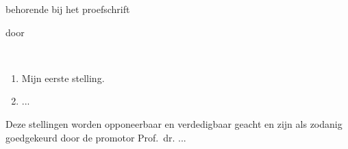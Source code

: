\documentclass[10pt]{book}
\begin{document}
\begin{center}

{\makeatletter
\bfseries\Large{}
\makeatother}

\smallskip

{\large behorende bij het proefschrift}

\bigskip
\medskip

{\makeatletter
\bfseries\LARGE\sffamily{\@title}
\makeatother}

{\makeatletter
\ifx\@subtitle\undefined\else
    \smallskip
    \Large\@subtitle
\fi
\makeatother}

\medskip

{\large door}

\medskip

\makeatletter
{\large \@firstname~\@middlename~{\MakeUppercase \@lastname}}
\makeatother

\end{center}

\bigskip

\begin{enumerate}
	\item Mijn eerste stelling.
	{\hfill {}}

	\item ...
\end{enumerate}

\vfill

\bigskip

\noindent Deze stellingen worden opponeerbaar en verdedigbaar geacht en zijn als zodanig goedgekeurd door de promotor Prof.~dr. ...
\end{document}
